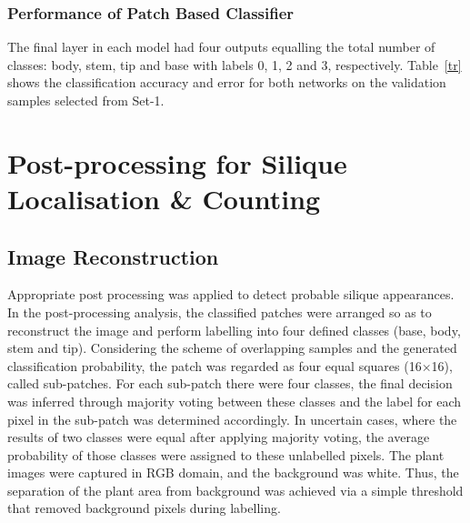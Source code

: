 \documentclass[a4paper,num-refs]{oup-contemporary}
\begin{document}
\subsubsection{Performance of Patch Based Classifier}
The final layer in each model had four outputs equalling the total number of classes: body, stem, tip and base with labels 0, 1, 2 and 3, respectively. Table~\ref{tr} shows the classification accuracy and error for both networks on the validation samples selected from Set-1.

\section{Post-processing for Silique Localisation \& Counting}
\subsection{Image Reconstruction}
Appropriate post processing was applied to detect  probable silique appearances. In the post-processing analysis, the classified patches were arranged  so as to reconstruct the image and perform labelling into four defined classes (base, body, stem and tip). 
Considering the scheme of overlapping samples and the generated classification probability, the patch was regarded as four equal squares (16$\times$16), called sub-patches. For each sub-patch there were four classes, the final decision was inferred through majority voting between these classes and the label for each pixel in the sub-patch was determined accordingly. In  uncertain cases, where the results of two classes were equal after applying majority voting, the average probability of those classes were assigned to these unlabelled pixels. The plant images were captured in RGB domain, and the background was white. Thus, the separation of the plant area from background was achieved via a simple threshold that removed background pixels during labelling.
\end{document}
